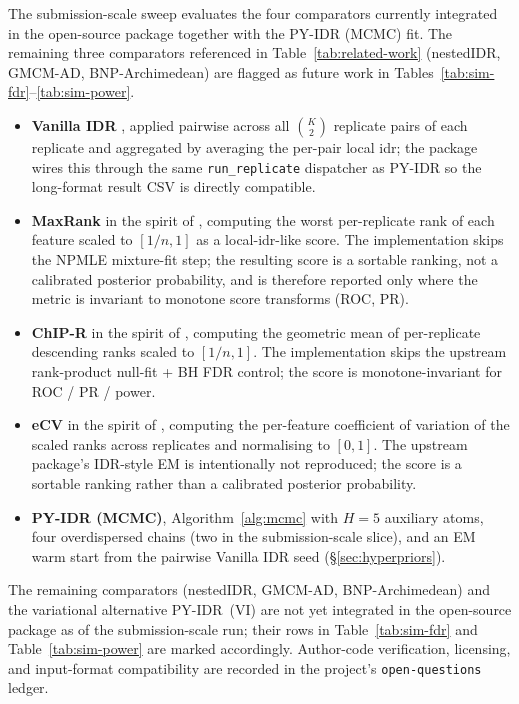 The submission-scale sweep evaluates the four comparators currently integrated
in the open-source package together with the PY-IDR (MCMC) fit. The remaining
three comparators referenced in Table~\ref{tab:related-work} (nestedIDR,
GMCM-AD, BNP-Archimedean) are flagged as future work in
Tables~\ref{tab:sim-fdr}--\ref{tab:sim-power}.
\begin{itemize}[leftmargin=*]
\item \textbf{Vanilla IDR} \citep{LiBrownHuangBickel2011}, applied pairwise
across all $\binom{K}{2}$ replicate pairs of each replicate and aggregated by
averaging the per-pair local idr; the package wires this through the same
\texttt{run\_replicate} dispatcher as PY-IDR so the long-format result CSV is
directly compatible.
\item \textbf{MaxRank} in the spirit of \citet{Philtron2018MaRR}, computing
the worst per-replicate rank of each feature scaled to $[1/n, 1]$ as a
local-idr-like score. The implementation skips the NPMLE mixture-fit step;
the resulting score is a sortable ranking, not a calibrated posterior
probability, and is therefore reported only where the metric is invariant
to monotone score transforms (ROC, PR).
\item \textbf{ChIP-R} in the spirit of \citet{Newell2021ChIPR}, computing the
geometric mean of per-replicate descending ranks scaled to $[1/n, 1]$. The
implementation skips the upstream rank-product null-fit + BH FDR control;
the score is monotone-invariant for ROC / PR / power.
\item \textbf{eCV} in the spirit of \citet{Iakovidis2024eCV}, computing the
per-feature coefficient of variation of the scaled ranks across replicates
and normalising to $[0, 1]$. The upstream package's IDR-style EM is
intentionally not reproduced; the score is a sortable ranking rather than
a calibrated posterior probability.
\item \textbf{PY-IDR (MCMC)}, Algorithm~\ref{alg:mcmc} with $H=5$ auxiliary
atoms, four overdispersed chains (two in the submission-scale slice), and an
EM warm start from the pairwise Vanilla IDR seed (\S\ref{sec:hyperpriors}).
\end{itemize}
The remaining comparators (nestedIDR, GMCM-AD, BNP-Archimedean) and the
variational alternative PY-IDR~(VI) are not yet integrated in the open-source
package as of the submission-scale run; their rows in Table~\ref{tab:sim-fdr}
and Table~\ref{tab:sim-power} are marked accordingly. Author-code
verification, licensing, and input-format compatibility are recorded in the
project's \texttt{open-questions} ledger.

